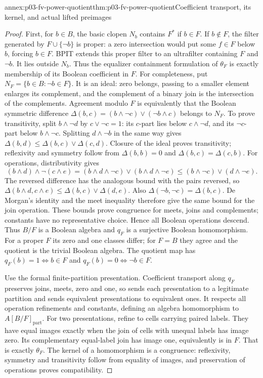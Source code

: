\begin{annexitem}{annex:p03-fv-power-quotient}{thm:p03-fv-power-quotient}{Coefficient transport, its kernel, and actual lifted preimages}
\begin{proof}
First, for \(b\in B\), the basic clopen \(N_b\) contains \(F^*\)
if \(b\in F\). If \(b\notin F\), the filter generated by
\(F\cup\{\neg b\}\) is proper: a zero intersection would put some
\(f\in F\) below \(b\), forcing \(b\in F\). BPIT extends this
proper filter to an ultrafilter containing \(F\) and \(\neg b\).
It lies outside \(N_b\). Thus the equalizer containment formulation of
\(\theta_F\) is exactly membership of its Boolean coefficient in \(F\).
For completeness, put \(N_F=\{b\in B:\neg b\in F\}\). It is an
ideal: zero belongs, passing to a smaller element enlarges its complement,
and the complement of a binary join is the intersection of the complements.
Agreement modulo \(F\) is equivalently that the Boolean symmetric
difference \(\Delta(b,c)=(b\wedge\neg c)\vee(\neg b\wedge c)\)
belongs to \(N_F\). To prove transitivity, split
\(b\wedge\neg d\) by \(c\vee\neg c=1\): its \(c\)-part
lies below \(c\wedge\neg d\), and its \(\neg c\)-part below
\(b\wedge\neg c\). Splitting \(d\wedge\neg b\) in the same
way gives \(\Delta(b,d)\le\Delta(b,c)\vee\Delta(c,d)\).
Closure of the ideal proves transitivity; reflexivity and symmetry follow
from \(\Delta(b,b)=0\) and \(\Delta(b,c)=\Delta(c,b)\).
For operations, distributivity gives
\[
 (b\wedge d)\wedge\neg(c\wedge e)
   =(b\wedge d\wedge\neg c)\vee(b\wedge d\wedge\neg e)
   \le(b\wedge\neg c)\vee(d\wedge\neg e).
\]
The reversed difference has the analogous bound with the pairs reversed,
so \(\Delta(b\wedge d,c\wedge e)\le
\Delta(b,c)\vee\Delta(d,e)\). Also
\(\Delta(\neg b,\neg c)=\Delta(b,c)\). De Morgan's identity and
the meet inequality therefore give the same bound for the join operation.
These bounds prove congruence for meets, joins and complements; constants
have no representative choice. Hence all Boolean operations descend.
Thus \(B/F\) is a Boolean algebra and \(q_F\) is a surjective Boolean
homomorphism. For a proper \(F\) its zero and one classes differ; for
\(F=B\) they agree and the quotient is the trivial Boolean algebra.
The quotient map has
\(q_F(b)=1\Longleftrightarrow b\in F\) and
\(q_F(b)=0\Longleftrightarrow\neg b\in F\).

Use the formal finite-partition presentation. Coefficient transport along
\(q_F\) preserves joins, meets, zero and one, so sends each presentation
to a legitimate partition and sends equivalent presentations to equivalent
ones. It respects all operation refinements and constants, defining an
algebra homomorphism to \(A[B/F]_{\mathrm{part}}\).
For two presentations, refine to cells carrying paired labels. They have
equal images exactly when the join of cells with unequal labels has image
zero. Its complementary equal-label join has image one, equivalently is
in \(F\). That is exactly \(\theta_F\). The kernel of a homomorphism
is a congruence: reflexivity, symmetry and transitivity follow from equality
of images, and preservation of operations proves compatibility.


\end{proof}
\end{annexitem}
